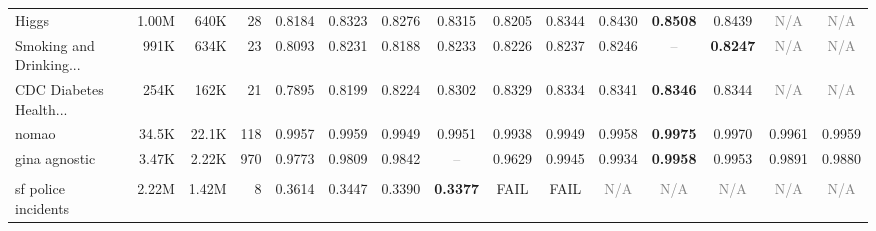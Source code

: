 \begin{table}[t]
{\begin{tabular}{lrrrccccccccccc}
Higgs & 1.00M & 640K & 28 & \cellcolor[HTML]{F4CCCC}0.8184 & \cellcolor[HTML]{FDEDCC}0.8323 & \cellcolor[HTML]{FAE2CC}0.8276 & \cellcolor[HTML]{FDEBCC}0.8315 & \cellcolor[HTML]{F5D1CC}0.8205 & \cellcolor[HTML]{FFF2CC}0.8344 & \cellcolor[HTML]{EBEED0}0.8430 & \cellcolor[HTML]{D9EAD3}\textbf{0.8508} & \cellcolor[HTML]{E9EDD0}0.8439 & \textcolor{gray}{N/A} & \textcolor{gray}{N/A} \\
Smoking and Drinking... & 991K & 634K & 23 & \cellcolor[HTML]{F4CCCC}0.8093 & \cellcolor[HTML]{E1ECD2}0.8231 & \cellcolor[HTML]{F6F0CE}0.8188 & \cellcolor[HTML]{E0EBD2}0.8233 & \cellcolor[HTML]{E3ECD1}0.8226 & \cellcolor[HTML]{DEEBD2}0.8237 & \cellcolor[HTML]{D9EAD3}0.8246 & \textcolor{gray}{--} & \cellcolor[HTML]{D9EAD3}\textbf{0.8247} & \textcolor{gray}{N/A} & \textcolor{gray}{N/A} \\
CDC Diabetes Health... & 254K & 162K & 21 & \cellcolor[HTML]{F4CCCC}0.7895 & \cellcolor[HTML]{F2EFCE}0.8199 & \cellcolor[HTML]{EEEECF}0.8224 & \cellcolor[HTML]{E0ECD2}0.8302 & \cellcolor[HTML]{DCEBD2}0.8329 & \cellcolor[HTML]{DBEAD3}0.8334 & \cellcolor[HTML]{DAEAD3}0.8341 & \cellcolor[HTML]{D9EAD3}\textbf{0.8346} & \cellcolor[HTML]{D9EAD3}0.8344 & \textcolor{gray}{N/A} & \textcolor{gray}{N/A} \\
nomao & 34.5K & 22.1K & 118 & \cellcolor[HTML]{FEF2CC}0.9957 & \cellcolor[HTML]{FAF1CD}0.9959 & \cellcolor[HTML]{FBE3CC}0.9949 & \cellcolor[HTML]{FCE7CC}0.9951 & \cellcolor[HTML]{F4CCCC}0.9938 & \cellcolor[HTML]{FBE3CC}0.9949 & \cellcolor[HTML]{FCF1CD}0.9958 & \cellcolor[HTML]{D9EAD3}\textbf{0.9975} & \cellcolor[HTML]{E3ECD1}0.9970 & \cellcolor[HTML]{F6F0CE}0.9961 & \cellcolor[HTML]{FAF1CD}0.9959 \\
gina agnostic & 3.47K & 2.22K & 970 & \cellcolor[HTML]{FEEDCC}0.9773 & \cellcolor[HTML]{FBF1CD}0.9809 & \cellcolor[HTML]{F4F0CE}0.9842 & \textcolor{gray}{--} & \cellcolor[HTML]{F4CCCC}0.9629 & \cellcolor[HTML]{DCEBD2}0.9945 & \cellcolor[HTML]{DFEBD2}0.9934 & \cellcolor[HTML]{D9EAD3}\textbf{0.9958} & \cellcolor[HTML]{DAEAD3}0.9953 & \cellcolor[HTML]{E8EDD0}0.9891 & \cellcolor[HTML]{EBEED0}0.9880 \\
\addlinespace[2pt]
\rowcolor{gray!15}
\multicolumn{15}{l}{\textbf{Log Loss}} \\
sf police incidents & 2.22M & 1.42M & 8 & \cellcolor[HTML]{F4CCCC}0.3614 & \cellcolor[HTML]{EFEFCF}0.3447 & \cellcolor[HTML]{DDEBD2}0.3390 & \cellcolor[HTML]{D9EAD3}\textbf{0.3377} & \textcolor{red!70!black}{FAIL} & \textcolor{red!70!black}{FAIL} & \textcolor{gray}{N/A} & \textcolor{gray}{N/A} & \textcolor{gray}{N/A} & \textcolor{gray}{N/A} & \textcolor{gray}{N/A} \\

\end{tabular}}
\end{table}
